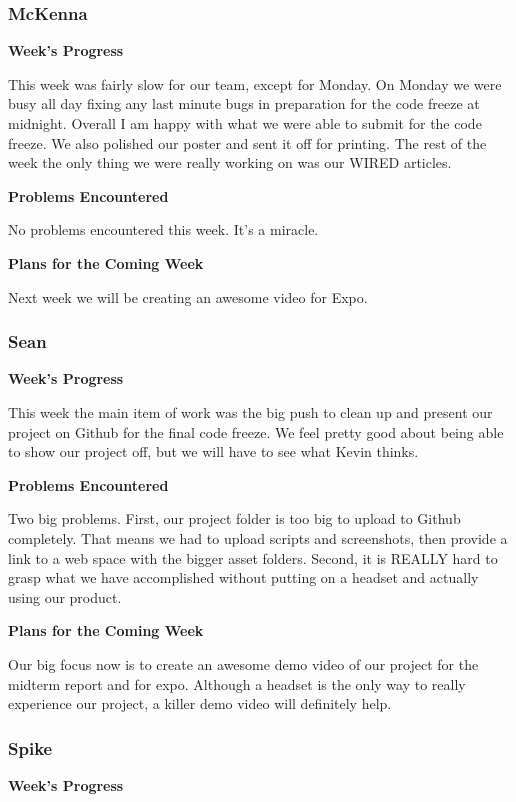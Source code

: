 \documentclass[10pt,journal,compsoc,onecolumn, draftclsnofoot]{IEEEtran}
\begin{document}
\subsubsection{McKenna}
\noindent \textbf{Week's Progress}

This week was fairly slow for our team, except for Monday. On Monday we were busy all day fixing any last minute bugs in preparation for the code freeze at midnight. Overall I am happy with what we were able to submit for the code freeze. We also polished our poster and sent it off for printing. The rest of the week the only thing we were really working on was our WIRED articles.

\noindent \textbf{Problems Encountered}

No problems encountered this week. It's a miracle.

\noindent \textbf{Plans for the Coming Week}

Next week we will be creating an awesome video for Expo.

\subsubsection{Sean}
\noindent \textbf{Week's Progress}

This week the main item of work was the big push to clean up and present our project on Github for the final code freeze. We feel pretty good about being able to show our project off, but we will have to see what Kevin thinks.

\noindent \textbf{Problems Encountered}

Two big problems. First, our project folder is too big to upload to Github completely. That means we had to upload scripts and screenshots, then provide a link to a web space with the bigger asset folders. Second, it is REALLY hard to grasp what we have accomplished without putting on a headset and actually using our product.

\noindent \textbf{Plans for the Coming Week}

Our big focus now is to create an awesome demo video of our project for the midterm report and for expo. Although a headset is the only way to really experience our project, a killer demo video will definitely help.

\subsubsection{Spike}
\noindent \textbf{Week's Progress}
\end{document}
